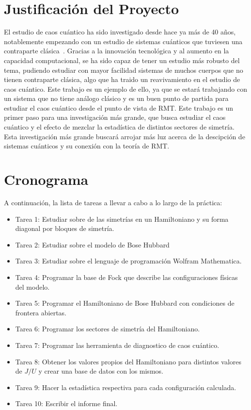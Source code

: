 \documentclass[spanish,titlepage,table]{practicas}
\begin{document}
\section{Justificación del Proyecto}
El estudio de caos cuántico ha sido investigado desde hace ya más de 40 años, notablemente empezando con un estudio de sistemas cuánticos
que tuviesen una contraparte clásica~\cite{Bohigas_1984}. Gracias a la innovación tecnológica y al aumento en la capacidad 
computacional, se ha sido capaz de tener un estudio más robusto del tema,
pudiendo estudiar con mayor facilidad sistemas de muchos cuerpos que no tienen contraparte clásica, algo que ha traido un reavivamiento en el estudio de caos cuántico. Este trabajo es un ejemplo de ello, ya que se estará trabajando con 
un sistema que no tiene análogo clásico y es un buen punto de partida para estudiar el caos cuántico desde el punto de vista de RMT.
Este trabajo es un primer paso para una investigación más grande, que busca estudiar el caos cuántico y el efecto de mezclar la estadística 
de distintos sectores de simetría. Esta investigación más grande buscará arrojar más luz acerca de la descipción de sistemas cuánticos y su conexión con la teoría de RMT.

\section{Cronograma}
A continuación, la lista de tareas a llevar a cabo a lo largo de la práctica:
\begin{itemize}
    \item Tarea 1: Estudiar sobre de las simetrías en un Hamiltoniano y su forma diagonal por bloques de simetría.
    \item Tarea 2: Estudiar sobre el modelo de Bose Hubbard
    \item Tarea 3: Estudiar sobre el lenguaje de programación Wolfram Mathematica.
    \item Tarea 4: Programar la base de Fock que describe las configuraciones físicas del modelo.
    \item Tarea 5: Programar el Hamiltoniano de Bose Hubbard con condiciones de frontera abiertas.
    \item Tarea 6: Programar los sectores de simetría del Hamiltoniano.
    \item Tarea 7: Programar las herramienta de diagnostico de caos cuántico. 
    \item Tarea 8: Obtener los valores propios del Hamiltoniano para distintos valores de $J/U$ y crear una base de datos con los mismos.
    \item Tarea 9: Hacer la estadística respectiva para cada configuración calculada.
    \item Tarea 10: Escribir el informe final.
\end{itemize}



\end{document}
